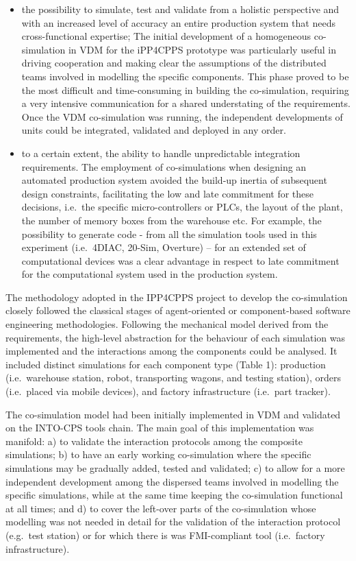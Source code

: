 \begin{itemize}
\item the possibility to simulate, test and validate from a holistic perspective and with an increased level of accuracy an entire production system that needs cross-functional expertise; The initial development of a homogeneous co-simulation in VDM for the iPP4CPPS prototype was particularly useful in driving cooperation and making clear the assumptions of the distributed teams involved in modelling the specific components. This phase proved to be the most difficult and time-consuming in building the co-simulation, requiring a very intensive communication for a shared understating of the requirements. Once the VDM co-simulation was running, the independent developments of units could be integrated, validated and deployed in any order.
\item to a certain extent, the ability to handle unpredictable integration requirements. The employment of co-simulations when designing an automated production system avoided the build-up inertia of subsequent design constraints, facilitating the low and late commitment for these decisions, i.e.\ the specific micro-controllers or PLCs, the layout of the plant, the number of memory boxes from the warehouse etc. For example, the possibility to generate code - from all the simulation tools used in this experiment (i.e.\ 4DIAC, 20-Sim, Overture) -- for an extended set of computational devices was a clear advantage in respect to late commitment for the computational system used in the production system. 
\end{itemize}

The methodology adopted in the IPP4CPPS project to develop the co-simulation closely followed the classical stages of agent-oriented or component-based software engineering methodologies. Following the mechanical model derived from the requirements, the high-level abstraction for the behaviour of each simulation was implemented and the interactions among the components could be analysed. It included distinct simulations for each component type (Table 1): production (i.e.\ warehouse station, robot, transporting wagons, and testing station), orders (i.e.\ placed via mobile devices), and factory infrastructure (i.e.\ part tracker). 

The co-simulation model had been initially implemented in VDM and validated on the INTO-CPS tools chain. The main goal of this implementation was manifold: a) to validate the interaction protocols among the composite simulations; b) to have an early working co-simulation where the specific simulations may be gradually added, tested and validated; c) to allow for a more independent development among the dispersed teams involved in modelling the specific simulations, while at the same time keeping the co-simulation functional at all times; and d) to cover the left-over parts of the co-simulation whose modelling was not needed in detail for the validation of the interaction protocol (e.g.\ test station) or for which there is was FMI-compliant tool (i.e.\ factory infrastructure).   

